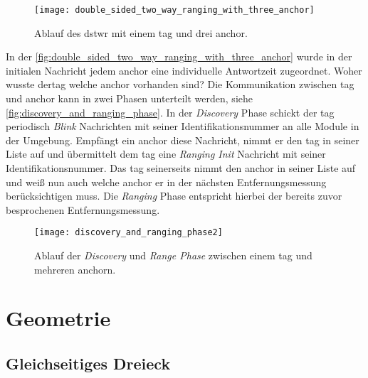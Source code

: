 \begin{figure}
	\centering
	\texttt{[image: double\_sided\_two\_way\_ranging\_with\_three\_anchor]}
	\caption{Ablauf des \acrlong{dstwr} mit einem \Gls{tag} und drei \Gls{anchor}.}
	\label{fig:double_sided_two_way_ranging_with_three_anchor}
\end{figure}

In der \autoref{fig:double_sided_two_way_ranging_with_three_anchor} wurde in der initialen Nachricht jedem \Gls{anchor} eine individuelle Antwortzeit zugeordnet. Woher wusste der\Gls{tag} welche \Gls{anchor} vorhanden sind? Die Kommunikation zwischen \Gls{tag} und \Gls{anchor} kann in zwei Phasen unterteilt werden, siehe \autoref{fig:discovery_and_ranging_phase}. In der \textit{Discovery} Phase schickt der \Gls{tag} periodisch \textit{Blink} Nachrichten mit seiner Identifikationsnummer an alle Module in der Umgebung. Empfängt ein \Gls{anchor} diese Nachricht, nimmt er den \Gls{tag} in seiner Liste auf und übermittelt dem \Gls{tag} eine \textit{Ranging Init} Nachricht mit seiner Identifikationsnummer. Das \Gls{tag} seinerseits nimmt den \Gls{anchor} in seiner Liste auf und weiß nun auch welche \Gls{anchor} er in der nächsten Entfernungsmessung berücksichtigen muss. Die \textit{Ranging} Phase entspricht hierbei der bereits zuvor besprochenen Entfernungsmessung.

\begin{figure}
	\centering
	\texttt{[image: discovery\_and\_ranging\_phase2]}
	\caption{Ablauf der \textit{Discovery} und \textit{Range Phase} zwischen einem \Gls{tag} und mehreren \Gls{anchor}n.}
	\label{fig:discovery_and_ranging_phase}
\end{figure}


%
%
%
\section{Geometrie}


%
%
%
\subsection{Gleichseitiges Dreieck}

